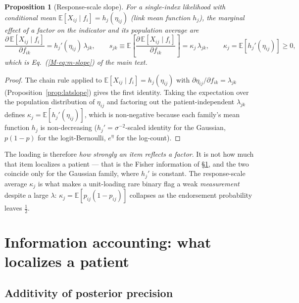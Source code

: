 \documentclass[11pt]{article}
\newcommand{\eED}{\mathbb{E}}
\theoremstyle{plain}
\newtheorem{proposition}{Proposition}
\theoremstyle{definition}
\newcommand{\MEq}[1]{Eq.~(\ref{M-#1})}
\begin{document}
\begin{proposition}[Response-scale slope]\label{prop:respslope}
For a single-index likelihood with conditional mean
$\eED[X_{ij}\mid f_i]=h_j(\eta_{ij})$ (link mean function $h_j$), the marginal effect of a
factor on the indicator and its population average are
\begin{equation}
  \frac{\partial\,\eED[X_{ij}\mid f_i]}{\partial f_{ik}}=h_j'(\eta_{ij})\,\lambda_{jk},
  \qquad
  s_{jk}\equiv\eED\!\left[\frac{\partial\,\eED[X_{ij}\mid f_i]}{\partial f_{ik}}\right]
  =\kappa_j\,\lambda_{jk},\qquad
  \kappa_j=\eED\!\left[h_j'(\eta_{ij})\right]\ge 0 ,
  \label{eq:respslope}
\end{equation}
which is \MEq{eq:m-slope} of the main text.
\end{proposition}
\begin{proof}
The chain rule applied to $\eED[X_{ij}\mid f_i]=h_j(\eta_{ij})$ with
$\partial\eta_{ij}/\partial f_{ik}=\lambda_{jk}$ (Proposition~\ref{prop:latslope}) gives the
first identity. Taking the expectation over the population distribution of $\eta_{ij}$ and
factoring out the patient-independent $\lambda_{jk}$ defines
$\kappa_j=\eED[h_j'(\eta_{ij})]$, which is non-negative because each family's mean function
$h_j$ is non-decreasing ($h_j'=\sigma^{-2}$-scaled identity for the Gaussian,
$p(1-p)$ for the logit-Bernoulli, $e^{\eta}$ for the log-count).
\end{proof}
\noindent
The loading is therefore \emph{how strongly an item reflects a factor}. It is not how much
that item localizes a patient --- that is the Fisher information of \S\ref{sec:info}, and the
two coincide only for the Gaussian family, where $h_j'$ is constant. The response-scale
average $\kappa_j$ is what makes a unit-loading rare binary flag a weak \emph{measurement}
despite a large $\lambda$: $\kappa_j=\eED[p_{ij}(1-p_{ij})]$ collapses as the endorsement
probability leaves $\tfrac12$.

\section{Information accounting: what localizes a patient}
\label{sec:info}

\subsection{Additivity of posterior precision}
\label{sub:additive}
\end{document}
